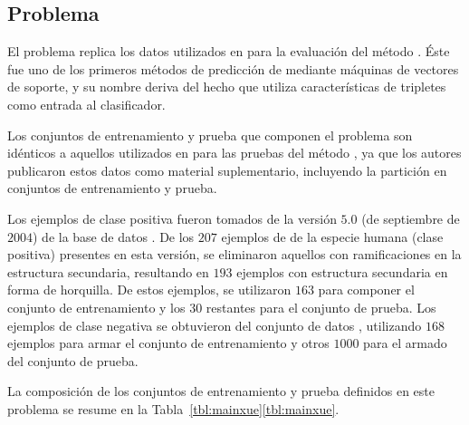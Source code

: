 %
%
\subsection{Problema \tripletsvm}
%
El problema \prob{\tripletsvm} replica los datos utilizados en
\cite{xue} para la evaluación del método \work{\tripletsvm}.
Éste fue uno de los primeros métodos de predicción de 
mediante máquinas de vectores de soporte, y su nombre deriva del hecho
que utiliza características de tripletes como entrada al clasificador.

Los conjuntos de entrenamiento y prueba que componen el problema
\prob{\tripletsvm} son idénticos a aquellos utilizados en \cite{xue}
para las pruebas del método \work{\tripletsvm}, ya que los autores
publicaron estos datos como material suplementario, incluyendo la
partición en conjuntos de entrenamiento y prueba.

Los ejemplos de clase positiva fueron tomados de la versión $5$.$0$
(de septiembre de $2004$) de la base de datos \dset\mirbase.
De los $207$ ejemplos de  de la especie humana (clase
positiva) presentes en esta versión, se eliminaron aquellos con
ramificaciones en la estructura secundaria, resultando en $193$
ejemplos con estructura secundaria en forma de horquilla.
De estos ejemplos, se utilizaron $163$ para componer el conjunto de
entrenamiento y los $30$ restantes para el conjunto de prueba.
Los ejemplos de clase negativa se obtuvieron del conjunto de datos
, utilizando $168$ ejemplos para armar el conjunto de
entrenamiento y otros $1000$ para el armado del conjunto de prueba.

La composición de los conjuntos de entrenamiento y prueba definidos en
este problema se resume en la
\iflatexml{}Tabla~\ref{tbl:mainxue}\else\autoref{tbl:mainxue}\fi.
